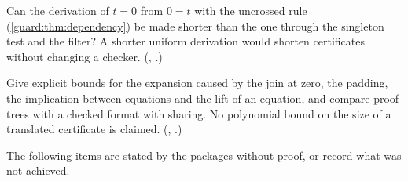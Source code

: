 \begin{question}
\label{guard:q:symmetry}
Can the derivation of $t=0$ from $0=t$ with the uncrossed rule
(\cref{guard:thm:dependency}) be made shorter than the one through the
singleton test and the filter?  A shorter uniform derivation would shorten
certificates without changing a checker.  (,
.)
\end{question}

\begin{question}
\label{guard:q:proofsize}
Give explicit bounds for the expansion caused by the join at zero, the
padding, the implication between equations and the lift of an equation, and
compare proof trees with a checked format with sharing.  No polynomial bound
on the size of a translated certificate is claimed.
(, .)
\end{question}

The following items are stated by the packages without proof, or record what
was not achieved.

